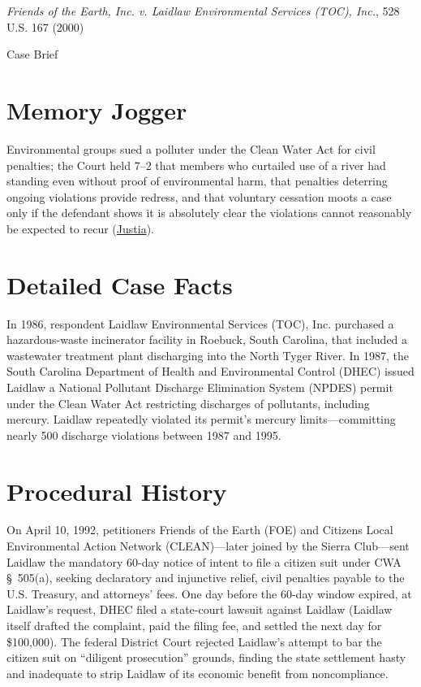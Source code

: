 \documentclass[12pt]{article}
\begin{document}
\begin{center}
{\LARGE \textit{Friends of the Earth, Inc. v. Laidlaw Environmental Services (TOC), Inc.}, 528 U.S. 167 (2000)\par}
\vspace{0.8em}
{\large Case Brief\par}
\end{center}
\vspace{1em}

\section{Memory Jogger}
Environmental groups sued a polluter under the Clean Water Act for civil penalties; the Court held 7--2 that members who curtailed use of a river had standing even without proof of environmental harm, that penalties deterring ongoing violations provide redress, and that voluntary cessation moots a case only if the defendant shows it is absolutely clear the violations cannot reasonably be expected to recur (\href{https://supreme.justia.com/cases/federal/us/528/167/}{Justia}).

\section{Detailed Case Facts}
In 1986, respondent Laidlaw Environmental Services (TOC), Inc. purchased a hazardous-waste incinerator facility in Roebuck, South Carolina, that included a wastewater treatment plant discharging into the North Tyger River. In 1987, the South Carolina Department of Health and Environmental Control (DHEC) issued Laidlaw a National Pollutant Discharge Elimination System (NPDES) permit under the Clean Water Act restricting discharges of pollutants, including mercury. Laidlaw repeatedly violated its permit's mercury limits---committing nearly 500 discharge violations between 1987 and 1995.

\section{Procedural History}
On April 10, 1992, petitioners Friends of the Earth (FOE) and Citizens Local Environmental Action Network (CLEAN)---later joined by the Sierra Club---sent Laidlaw the mandatory 60-day notice of intent to file a citizen suit under CWA \S~505(a), seeking declaratory and injunctive relief, civil penalties payable to the U.S. Treasury, and attorneys' fees. One day before the 60-day window expired, at Laidlaw's request, DHEC filed a state-court lawsuit against Laidlaw (Laidlaw itself drafted the complaint, paid the filing fee, and settled the next day for \$100,000). The federal District Court rejected Laidlaw's attempt to bar the citizen suit on ``diligent prosecution'' grounds, finding the state settlement hasty and inadequate to strip Laidlaw of its economic benefit from noncompliance.
\end{document}
